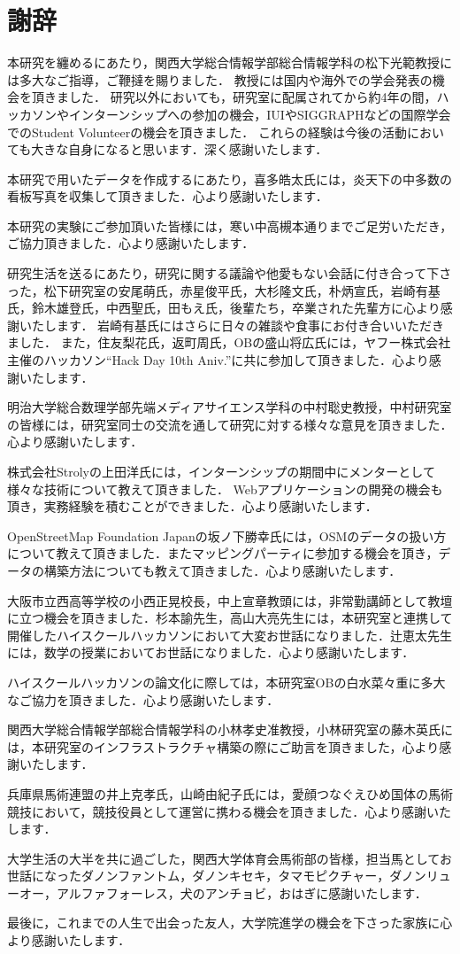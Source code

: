 \chapter*{謝辞}
本研究を纏めるにあたり，関西大学総合情報学部総合情報学科の松下光範教授には多大なご指導，ご鞭撻を賜りました．
教授には国内や海外での学会発表の機会を頂きました．
研究以外においても，研究室に配属されてから約4年の間，ハッカソンやインターンシップへの参加の機会，IUIやSIGGRAPHなどの国際学会でのStudent Volunteerの機会を頂きました．
これらの経験は今後の活動においても大きな自身になると思います．深く感謝いたします．

本研究で用いたデータを作成するにあたり，喜多皓太氏には，炎天下の中多数の看板写真を収集して頂きました．心より感謝いたします．

本研究の実験にご参加頂いた皆様には，寒い中高槻本通りまでご足労いただき，ご協力頂きました．心より感謝いたします．

研究生活を送るにあたり，研究に関する議論や他愛もない会話に付き合って下さった，松下研究室の安尾萌氏，赤星俊平氏，大杉隆文氏，朴炳宣氏，岩崎有基氏，鈴木雄登氏，中西聖氏，田もえ氏，後輩たち，卒業された先輩方に心より感謝いたします．
岩崎有基氏にはさらに日々の雑談や食事にお付き合いいただきました．
また，住友梨花氏，返町周氏，OBの盛山将広氏には，ヤフー株式会社主催のハッカソン``Hack Day 10th Aniv.''に共に参加して頂きました．心より感謝いたします．

明治大学総合数理学部先端メディアサイエンス学科の中村聡史教授，中村研究室の皆様には，研究室同士の交流を通して研究に対する様々な意見を頂きました．心より感謝いたします．

株式会社Strolyの上田洋氏には，インターンシップの期間中にメンターとして様々な技術について教えて頂きました．
Webアプリケーションの開発の機会も頂き，実務経験を積むことができました．心より感謝いたします．

OpenStreetMap Foundation Japanの坂ノ下勝幸氏には，OSMのデータの扱い方について教えて頂きました．またマッピングパーティに参加する機会を頂き，データの構築方法についても教えて頂きました．心より感謝いたします．

大阪市立西高等学校の小西正晃校長，中上宣章教頭には，非常勤講師として教壇に立つ機会を頂きました．杉本諭先生，高山大亮先生には，本研究室と連携して開催したハイスクールハッカソンにおいて大変お世話になりました．辻恵太先生には，数学の授業においてお世話になりました．心より感謝いたします．

ハイスクールハッカソンの論文化に際しては，本研究室OBの白水菜々重に多大なご協力を頂きました．心より感謝いたします．

関西大学総合情報学部総合情報学科の小林孝史准教授，小林研究室の藤木英氏には，本研究室のインフラストラクチャ構築の際にご助言を頂きました，心より感謝いたします．

兵庫県馬術連盟の井上克孝氏，山崎由紀子氏には，愛顔つなぐえひめ国体の馬術競技において，競技役員として運営に携わる機会を頂きました．心より感謝いたします．

大学生活の大半を共に過ごした，関西大学体育会馬術部の皆様，担当馬としてお世話になったダノンファントム，ダノンキセキ，タマモピクチャー，ダノンリューオー，アルファフォーレス，犬のアンチョビ，おはぎに感謝いたします．

最後に，これまでの人生で出会った友人，大学院進学の機会を下さった家族に心より感謝いたします．